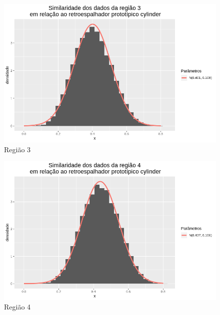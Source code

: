\documentclass[12pt]{article}
\begin{document}
\begin{figure}[!h]
    \centering
    \vspace{0.1\linewidth}
    \includegraphics[width = \linewidth]{../../Images/Report_18_12_20/cy_region3.png}
    \caption{Região 3}
    \label{fig:cy_r3}
\end{figure}

\begin{figure}[!h]
    \centering
    \vspace{0.1\linewidth}
    \includegraphics[width = \linewidth]{../../Images/Report_18_12_20/cy_region4.png}
    \caption{Região 4}
    \label{fig:cy_r4}
\end{figure}
\end{document}
